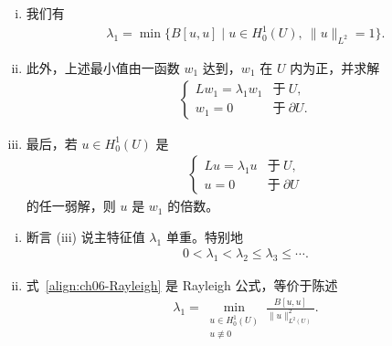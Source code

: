 \documentclass[../../main.tex]{subfiles}
\begin{document}
\begin{theorem}[主特征值的变分原理]\label{theorem:ch06-主特征值变分}
\begin{enumerate}[(i)]
\item 我们有
\begin{align}
\lambda_{1}=\min\{B[u,u]\mid u\in H^{1}_{0}(U),\ \|u\|_{L^{2}}=1\}.
\end{align}
\item 此外，上述最小值由一函数 $w_{1}$ 达到，$w_{1}$ 在 $U$ 内为正，并求解
\begin{align*}
\begin{cases}
Lw_{1}=\lambda_{1}w_{1} & \text{于}\ U,\\
w_{1}=0 & \text{于}\ \partial U.
\end{cases}
\end{align*}
\item 最后，若 $u\in H^{1}_{0}(U)$ 是
\begin{align*}
\begin{cases}
Lu=\lambda_{1}u & \text{于}\ U,\\
u=0 & \text{于}\ \partial U
\end{cases}
\end{align*}
的任一弱解，则 $u$ 是 $w_{1}$ 的倍数。
\end{enumerate}
\end{theorem}

\begin{remark}\label{remark:ch06-主特征值}
\leavevmode
\begin{enumerate}[(i)]
\item 断言 (iii) 说主特征值 $\lambda_{1}$ 单重。特别地
\begin{align*}
0<\lambda_{1}<\lambda_{2}\leqslant\lambda_{3}\leqslant\cdots.
\end{align*}
\item 式~\eqref{align:ch06-Rayleigh} 是 Rayleigh 公式，等价于陈述
\begin{align*}
\lambda_{1}=\min_{\substack{u\in H^{1}_{0}(U)\\ u\not\equiv 0}}\frac{B[u,u]}{\|u\|_{L^{2}(U)}^{2}}.
\end{align*}
\end{enumerate}
\end{remark}
\end{document}
